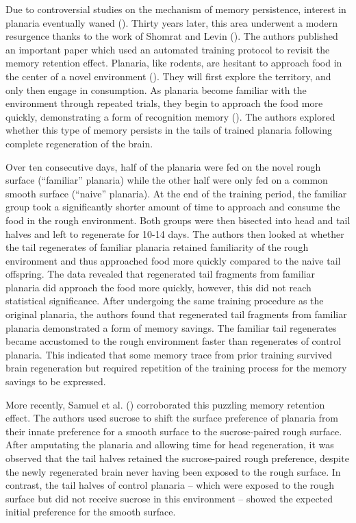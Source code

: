 \documentclass[
  jou,
  floatsintext,
  longtable,
  nolmodern,
  notxfonts,
  notimes,
  donotrepeattitle,
  colorlinks=true,linkcolor=blue,citecolor=blue,urlcolor=blue]{apa7}
\begin{document}
Due to controversial studies on the mechanism of memory persistence,
interest in planaria eventually waned
(). Thirty years
later, this area underwent a modern resurgence thanks to the work of
Shomrat and Levin (). The
authors published an important paper which used an automated training
protocol to revisit the memory retention effect. Planaria, like rodents,
are hesitant to approach food in the center of a novel environment
(). They will first
explore the territory, and only then engage in consumption. As planaria
become familiar with the environment through repeated trials, they begin
to approach the food more quickly, demonstrating a form of recognition
memory (). The
authors explored whether this type of memory persists in the tails of
trained planaria following complete regeneration of the brain.

Over ten consecutive days, half of the planaria were fed on the novel
rough surface (``familiar'' planaria) while the other half were only fed
on a common smooth surface (``naive'' planaria). At the end of the
training period, the familiar group took a significantly shorter amount
of time to approach and consume the food in the rough environment. Both
groups were then bisected into head and tail halves and left to
regenerate for 10-14 days. The authors then looked at whether the tail
regenerates of familiar planaria retained familiarity of the rough
environment and thus approached food more quickly compared to the naive
tail offspring. The data revealed that regenerated tail fragments from
familiar planaria did approach the food more quickly, however, this did
not reach statistical significance. After undergoing the same training
procedure as the original planaria, the authors found that regenerated
tail fragments from familiar planaria demonstrated a form of memory
savings. The familiar tail regenerates became accustomed to the rough
environment faster than regenerates of control planaria. This indicated
that some memory trace from prior training survived brain regeneration
but required repetition of the training process for the memory savings
to be expressed.

More recently, Samuel et al.
() corroborated this
puzzling memory retention effect. The authors used sucrose to shift the
surface preference of planaria from their innate preference for a smooth
surface to the sucrose-paired rough surface. After amputating the
planaria and allowing time for head regeneration, it was observed that
the tail halves retained the sucrose-paired rough preference, despite
the newly regenerated brain never having been exposed to the rough
surface. In contrast, the tail halves of control planaria -- which were
exposed to the rough surface but did not receive sucrose in this
environment -- showed the expected initial preference for the smooth
surface.
\end{document}
